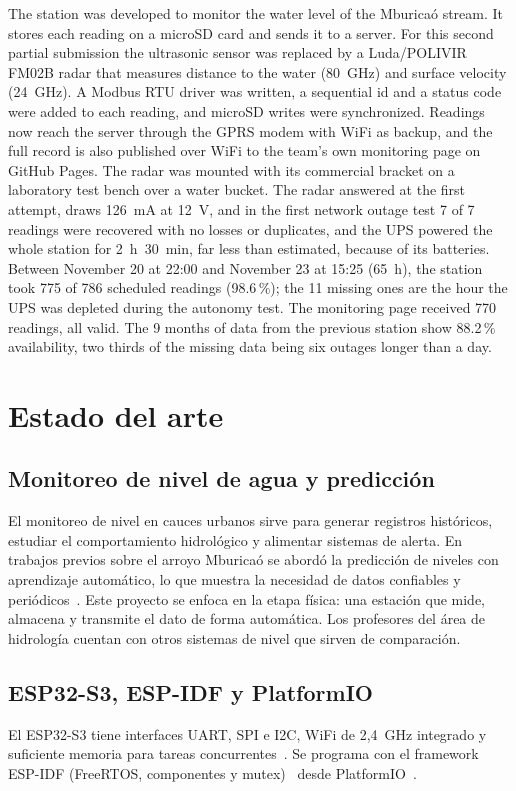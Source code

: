 \documentclass[11pt,a4paper]{article}
\newcommand{\seccion}[1]{\needspace{10\baselineskip}\section{#1}}
\begin{document}
The station was developed to monitor the water level of the Mburicaó stream.
It stores each reading on a microSD card and sends it to a server. For this
second partial submission the ultrasonic sensor was replaced by a
Luda/POLIVIR FM02B radar that measures distance to the water (80~GHz)
and surface velocity (24~GHz). A Modbus RTU driver was written, a sequential
id and a status code were added to each reading, and microSD
writes were synchronized. Readings now reach the server through the
GPRS modem with WiFi as backup, and the full record is also
published over WiFi to the team's own monitoring page on GitHub Pages.
The radar was mounted with its commercial bracket on a laboratory test
bench over a water bucket. The radar answered at the first attempt, draws
126~mA at 12~V, and in the first network outage test 7 of 7
readings were recovered with no losses or duplicates, and the UPS powered the
whole station for 2~h~30~min, far less than estimated, because of its
batteries. Between November 20 at 22:00 and November 23 at 15:25 (65~h), the
station took 775 of 786 scheduled readings (98.6\,\%); the 11 missing ones are
the hour the UPS was depleted during the autonomy test. The monitoring page
received 770 readings, all valid. The 9 months of data from the
previous station show 88.2\,\% availability, two thirds of the missing
data being six outages longer than a day.

\seccion{Estado del arte}

\subsection{Monitoreo de nivel de agua y predicción}
El monitoreo de nivel en cauces urbanos sirve para generar registros
históricos, estudiar el comportamiento hidrológico y alimentar sistemas de
alerta. En trabajos previos sobre el arroyo Mburicaó se abordó la predicción de
niveles con aprendizaje automático, lo que muestra la necesidad de datos
confiables y periódicos~\cite{aguilar}. Este proyecto se enfoca en la etapa
física: una estación que mide, almacena y transmite el dato de forma
automática. Los profesores del área de hidrología cuentan con otros sistemas de
nivel que sirven de comparación.

\subsection{ESP32-S3, ESP-IDF y PlatformIO}
El ESP32-S3 tiene interfaces UART, SPI e I2C, WiFi de 2,4~GHz integrado y
suficiente memoria para tareas concurrentes~\cite{esp32}. Se programa con el
framework ESP-IDF (FreeRTOS, componentes y mutex)~\cite{espidf} desde
PlatformIO~\cite{pio}.
\end{document}
